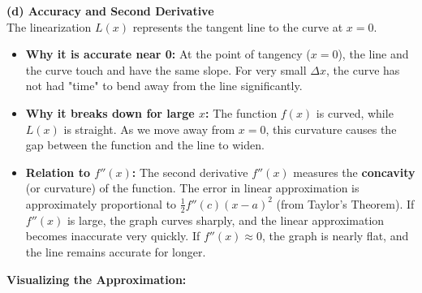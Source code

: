 \textbf{(d) Accuracy and Second Derivative} \\
    The linearization $L(x)$ represents the tangent line to the curve at $x=0$.
    \begin{itemize}
        \item \textbf{Why it is accurate near 0:} At the point of tangency ($x=0$), the line and the curve touch and have the same slope. For very small $\Delta x$, the curve has not had "time" to bend away from the line significantly.
        \item \textbf{Why it breaks down for large $x$:} The function $f(x)$ is curved, while $L(x)$ is straight. As we move away from $x=0$, this curvature causes the gap between the function and the line to widen.
        \item \textbf{Relation to $f''(x)$:} The second derivative $f''(x)$ measures the \textbf{concavity} (or curvature) of the function. The error in linear approximation is approximately proportional to $\frac{1}{2}f''(c)(x-a)^2$ (from Taylor's Theorem). If $f''(x)$ is large, the graph curves sharply, and the linear approximation becomes inaccurate very quickly. If $f''(x) \approx 0$, the graph is nearly flat, and the line remains accurate for longer.
    \end{itemize}


\vspace{1em}
\noindent\textbf{Visualizing the Approximation:}

\begin{center}
\end{center}
\pagebreak
